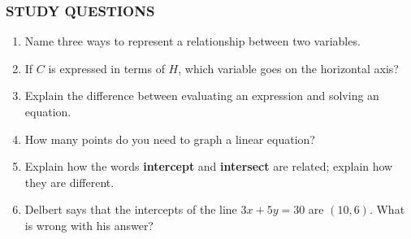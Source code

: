 \documentclass[10pt,]{book}
\newcommand{\terminology}[1]{\textbf{#1}}
\theoremstyle{plain}
\theoremstyle{definition}
\theoremstyle{definition}
\theoremstyle{definition}
\theoremstyle{definition}
\numberwithin{equation}{part}
\begin{document}
\subsubsection[{STUDY QUESTIONS}]{STUDY QUESTIONS}\label{subsubsection-3}
\leavevmode%
\begin{enumerate}[label=\arabic*]
\item\hypertarget{li-106}{}Name three ways to represent a relationship between two variables.%
\item\hypertarget{li-107}{}If \(C\) is expressed in terms of \(H\), which variable goes on the horizontal axis?%
\item\hypertarget{li-108}{}Explain the difference between evaluating an expression and solving an equation.%
\item\hypertarget{li-109}{}How many points do you need to graph a linear equation?%
\item\hypertarget{li-110}{}Explain how the words \terminology{intercept} and \terminology{intersect} are related; explain how they are different.%
\item\hypertarget{li-111}{}Delbert says that the intercepts of the line \(3x + 5y = 30\) are \((10, 6)\). What is wrong with his answer?%
\end{enumerate}
%
\typeout{************************************************}
\typeout{************************************************}
\end{document}
